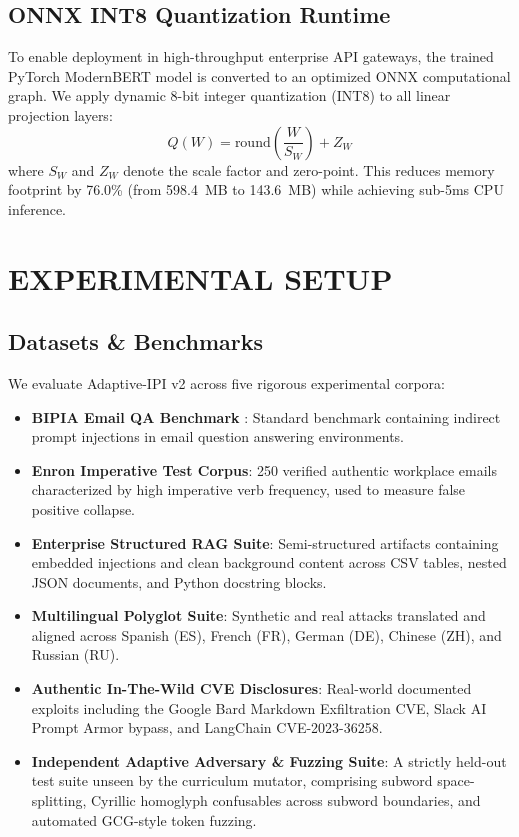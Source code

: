 \documentclass[conference]{IEEEtran}
\begin{document}
\subsection{ONNX INT8 Quantization Runtime}

To enable deployment in high-throughput enterprise API gateways, the trained PyTorch ModernBERT model is converted to an optimized ONNX computational graph. We apply dynamic 8-bit integer quantization (INT8) to all linear projection layers:
\begin{equation}
    Q(W) = \text{round}\left( \frac{W}{S_W} \right) + Z_W
\end{equation}
where $S_W$ and $Z_W$ denote the scale factor and zero-point. This reduces memory footprint by 76.0\% (from 598.4~MB to 143.6~MB) while achieving sub-5ms CPU inference.

\section{EXPERIMENTAL SETUP}

\subsection{Datasets \& Benchmarks}

We evaluate Adaptive-IPI v2 across five rigorous experimental corpora:
\begin{itemize}
    \item \textbf{BIPIA Email QA Benchmark} \cite{ref8}: Standard benchmark containing indirect prompt injections in email question answering environments.
    \item \textbf{Enron Imperative Test Corpus}: 250 verified authentic workplace emails characterized by high imperative verb frequency, used to measure false positive collapse.
    \item \textbf{Enterprise Structured RAG Suite}: Semi-structured artifacts containing embedded injections and clean background content across CSV tables, nested JSON documents, and Python docstring blocks.
    \item \textbf{Multilingual Polyglot Suite}: Synthetic and real attacks translated and aligned across Spanish (ES), French (FR), German (DE), Chinese (ZH), and Russian (RU).
    \item \textbf{Authentic In-The-Wild CVE Disclosures}: Real-world documented exploits including the Google Bard Markdown Exfiltration CVE, Slack AI Prompt Armor bypass, and LangChain CVE-2023-36258.
    \item \textbf{Independent Adaptive Adversary \& Fuzzing Suite}: A strictly held-out test suite unseen by the curriculum mutator, comprising subword space-splitting, Cyrillic homoglyph confusables across subword boundaries, and automated GCG-style token fuzzing.
\end{itemize}
\end{document}

